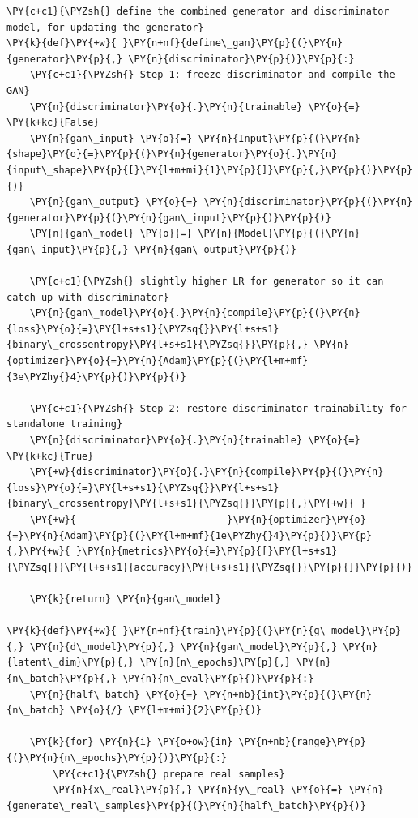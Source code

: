 \begin{Verbatim}[label=\makebox{\url{https://github.com/lucabaldini/cmepda/tree/master/slides/latex/snippets/gan_training.py}},commandchars=\\\{\}]
\PY{c+c1}{\PYZsh{} define the combined generator and discriminator model, for updating the generator}
\PY{k}{def}\PY{+w}{ }\PY{n+nf}{define\_gan}\PY{p}{(}\PY{n}{generator}\PY{p}{,} \PY{n}{discriminator}\PY{p}{)}\PY{p}{:}
    \PY{c+c1}{\PYZsh{} Step 1: freeze discriminator and compile the GAN}
    \PY{n}{discriminator}\PY{o}{.}\PY{n}{trainable} \PY{o}{=} \PY{k+kc}{False}
    \PY{n}{gan\_input} \PY{o}{=} \PY{n}{Input}\PY{p}{(}\PY{n}{shape}\PY{o}{=}\PY{p}{(}\PY{n}{generator}\PY{o}{.}\PY{n}{input\_shape}\PY{p}{[}\PY{l+m+mi}{1}\PY{p}{]}\PY{p}{,}\PY{p}{)}\PY{p}{)}
    \PY{n}{gan\_output} \PY{o}{=} \PY{n}{discriminator}\PY{p}{(}\PY{n}{generator}\PY{p}{(}\PY{n}{gan\_input}\PY{p}{)}\PY{p}{)}
    \PY{n}{gan\_model} \PY{o}{=} \PY{n}{Model}\PY{p}{(}\PY{n}{gan\_input}\PY{p}{,} \PY{n}{gan\_output}\PY{p}{)}
    
    \PY{c+c1}{\PYZsh{} slightly higher LR for generator so it can catch up with discriminator}
    \PY{n}{gan\_model}\PY{o}{.}\PY{n}{compile}\PY{p}{(}\PY{n}{loss}\PY{o}{=}\PY{l+s+s1}{\PYZsq{}}\PY{l+s+s1}{binary\_crossentropy}\PY{l+s+s1}{\PYZsq{}}\PY{p}{,} \PY{n}{optimizer}\PY{o}{=}\PY{n}{Adam}\PY{p}{(}\PY{l+m+mf}{3e\PYZhy{}4}\PY{p}{)}\PY{p}{)}
    
    \PY{c+c1}{\PYZsh{} Step 2: restore discriminator trainability for standalone training}
    \PY{n}{discriminator}\PY{o}{.}\PY{n}{trainable} \PY{o}{=} \PY{k+kc}{True}
    \PY{+w}{discriminator}\PY{o}{.}\PY{n}{compile}\PY{p}{(}\PY{n}{loss}\PY{o}{=}\PY{l+s+s1}{\PYZsq{}}\PY{l+s+s1}{binary\_crossentropy}\PY{l+s+s1}{\PYZsq{}}\PY{p}{,}\PY{+w}{ }
    \PY{+w}{                          }\PY{n}{optimizer}\PY{o}{=}\PY{n}{Adam}\PY{p}{(}\PY{l+m+mf}{1e\PYZhy{}4}\PY{p}{)}\PY{p}{,}\PY{+w}{ }\PY{n}{metrics}\PY{o}{=}\PY{p}{[}\PY{l+s+s1}{\PYZsq{}}\PY{l+s+s1}{accuracy}\PY{l+s+s1}{\PYZsq{}}\PY{p}{]}\PY{p}{)}
    
    \PY{k}{return} \PY{n}{gan\_model}

\PY{k}{def}\PY{+w}{ }\PY{n+nf}{train}\PY{p}{(}\PY{n}{g\_model}\PY{p}{,} \PY{n}{d\_model}\PY{p}{,} \PY{n}{gan\_model}\PY{p}{,} \PY{n}{latent\_dim}\PY{p}{,} \PY{n}{n\_epochs}\PY{p}{,} \PY{n}{n\_batch}\PY{p}{,} \PY{n}{n\_eval}\PY{p}{)}\PY{p}{:}
    \PY{n}{half\_batch} \PY{o}{=} \PY{n+nb}{int}\PY{p}{(}\PY{n}{n\_batch} \PY{o}{/} \PY{l+m+mi}{2}\PY{p}{)}
    
    \PY{k}{for} \PY{n}{i} \PY{o+ow}{in} \PY{n+nb}{range}\PY{p}{(}\PY{n}{n\_epochs}\PY{p}{)}\PY{p}{:}
        \PY{c+c1}{\PYZsh{} prepare real samples}
        \PY{n}{x\_real}\PY{p}{,} \PY{n}{y\_real} \PY{o}{=} \PY{n}{generate\_real\_samples}\PY{p}{(}\PY{n}{half\_batch}\PY{p}{)}
        

\end{Verbatim}
